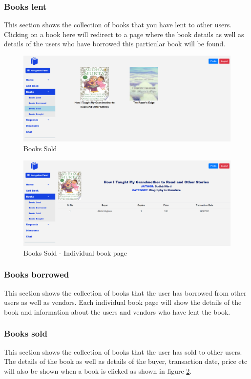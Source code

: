 \documentclass[conference]{IEEEtran}
\begin{document}
\subsubsection{Books lent}
This section shows the collection of books that you have lent to other users. Clicking on a book here will redirect to a page where the book details as well as details of the users who have borrowed this particular book will be found.
\begin{figure}[h]
     \centering
     \includegraphics[scale=0.20,margin=2,frame]{Books Sold.PNG}
     \caption{Books Sold}
     \label{fig:booksold}
 \end{figure}
 \begin{figure}[h]
     \centering
     \includegraphics[scale=0.20,margin=2,frame]{individualbooksold.PNG}
     \caption{Books Sold - Individual book page}
     \label{fig:individualbooksold}
 \end{figure}
\subsubsection{Books borrowed}
This section shows the collection of books that the user has borrowed from other users as well as vendors. Each individual book page will show the details of the book and information about the users and vendors who have lent the book.
\subsubsection{Books sold}
This section shows the collection of books that the user has sold to other users. The details of the book as well as details of the buyer, transaction date, price etc will also be shown when a book is clicked as shown in figure \ref{fig:individualbooksold}.
\end{document}
